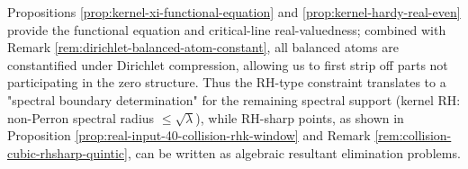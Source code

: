 \begin{remark}\label{rem:rh-core-elimination}
Propositions \ref{prop:kernel-xi-functional-equation} and \ref{prop:kernel-hardy-real-even} provide the functional equation and critical-line real-valuedness; combined with Remark \ref{rem:dirichlet-balanced-atom-constant}, all balanced atoms are constantified under Dirichlet compression, allowing us to first strip off parts not participating in the zero structure.
Thus the RH-type constraint translates to a "spectral boundary determination" for the remaining spectral support (kernel RH: non-Perron spectral radius \(\le \sqrt{\lambda}\)), while RH-sharp points, as shown in Proposition \ref{prop:real-input-40-collision-rhk-window} and Remark \ref{rem:collision-cubic-rhsharp-quintic}, can be written as algebraic resultant elimination problems.
\end{remark}


